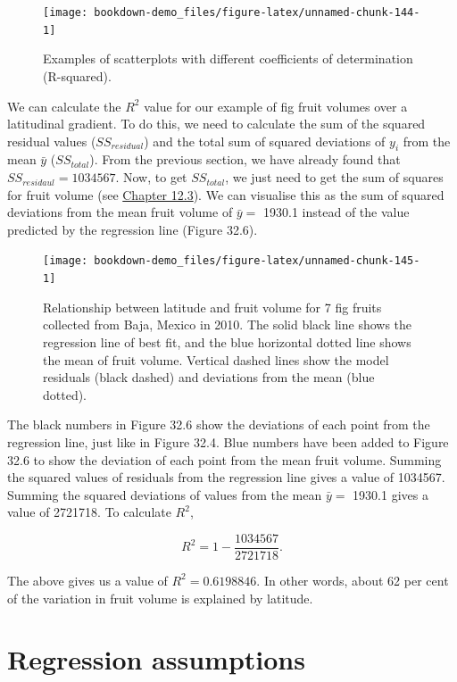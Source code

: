 \documentclass[
  openany]{scrbook}
\begin{document}
\begin{figure}
\texttt{[image: bookdown-demo\_files/figure-latex/unnamed-chunk-144-1]} \caption{Examples of scatterplots with different coefficients of determination (R-squared).}\label{fig:unnamed-chunk-144}
\end{figure}

We can calculate the \(R^{2}\) value for our example of fig fruit volumes over a latitudinal gradient.
To do this, we need to calculate the sum of the squared residual values (\(SS_{residual}\)) and the total sum of squared deviations of \(y_{i}\) from the mean \(\bar{y}\) (\(SS_{total}\)).
From the previous section, we have already found that \(SS_{residaul} = 1034567\).
Now, to get \(SS_{total}\), we just need to get the sum of squares for fruit volume (see \protect\hyperlink{the-variance}{Chapter 12.3}).
We can visualise this as the sum of squared deviations from the mean fruit volume of \(\bar{y} =\) 1930.1 instead of the value predicted by the regression line (Figure 32.6).

\begin{figure}
\texttt{[image: bookdown-demo\_files/figure-latex/unnamed-chunk-145-1]} \caption{Relationship between latitude and fruit volume for 7 fig fruits collected from Baja, Mexico in 2010. The solid black line shows the regression line of best fit, and the blue horizontal dotted line shows the mean of fruit volume. Vertical dashed lines show the model residuals (black dashed) and deviations from the mean (blue dotted).}\label{fig:unnamed-chunk-145}
\end{figure}

The black numbers in Figure 32.6 show the deviations of each point from the regression line, just like in Figure 32.4.
Blue numbers have been added to Figure 32.6 to show the deviation of each point from the mean fruit volume.
Summing the squared values of residuals from the regression line gives a value of 1034567.
Summing the squared deviations of values from the mean \(\bar{y} =\) 1930.1 gives a value of 2721718.
To calculate \(R^{2}\),

\[R^{2} = 1 - \frac{1034567}{2721718}.\]

The above gives us a value of \(R^{2} = 0.6198846\).
In other words, about 62 per cent of the variation in fruit volume is explained by latitude.

\hypertarget{regression-assumptions}{%
\section{Regression assumptions}\label{regression-assumptions}}
\end{document}
